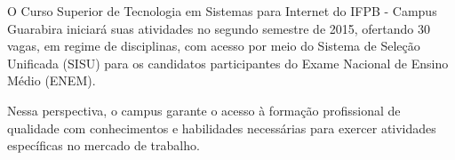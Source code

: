 	O Curso Superior de Tecnologia em Sistemas para Internet do IFPB - Campus Guarabira iniciará suas atividades no segundo semestre de 2015, ofertando 30 vagas, em regime de disciplinas, com acesso por meio do Sistema de Seleção Unificada (SISU) para os candidatos participantes do Exame Nacional de Ensino Médio (ENEM).

	Nessa perspectiva, o campus garante o acesso à formação profissional de qualidade com conhecimentos e habilidades necessárias para exercer atividades específicas no mercado de trabalho. 



